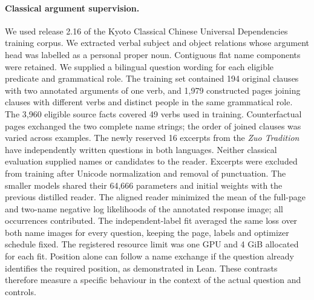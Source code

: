 \paragraph{Classical argument supervision.}
We used release 2.16 of the Kyoto Classical Chinese Universal Dependencies training corpus. We extracted verbal subject and object relations whose argument head was labelled as a personal proper noun. Contiguous flat name components were retained. We supplied a bilingual question wording for each eligible predicate and grammatical role. The training set contained 194 original clauses with two annotated arguments of one verb, and 1,979 constructed pages joining clauses with different verbs and distinct people in the same grammatical role. The 3,960 eligible source facts covered 49 verbs used in training. Counterfactual pages exchanged the two complete name strings; the order of joined clauses was varied across examples. The newly reserved 16 excerpts from the \textit{Zuo Tradition} have independently written questions in both languages. Neither classical evaluation supplied names or candidates to the reader. Excerpts were excluded from training after Unicode normalization and removal of punctuation. The smaller models shared their 64,666 parameters and initial weights with the previous distilled reader. The aligned reader minimized the mean of the full-page and two-name negative log likelihoods of the annotated response image; all occurrences contributed. The independent-label fit averaged the same loss over both name images for every question, keeping the page, labels and optimizer schedule fixed. The registered resource limit was one GPU and 4 GiB allocated for each fit. Position alone can follow a name exchange if the question already identifies the required position, as demonstrated in Lean. These contrasts therefore measure a specific behaviour in the context of the actual question and controls.
